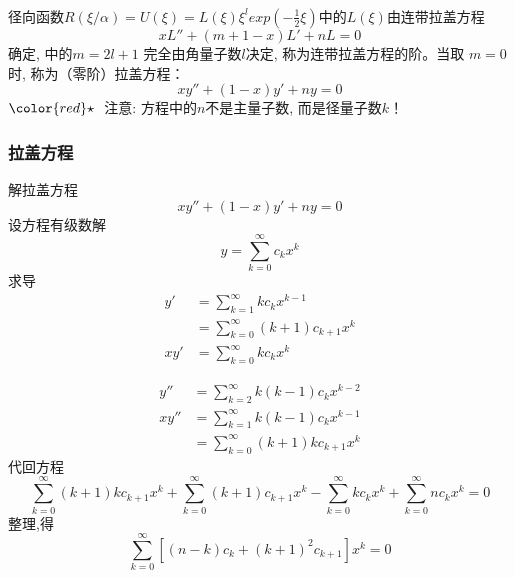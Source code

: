 \begin{frame}[label=current]
\frametitle{}
径向函数$R(\xi /\alpha)=U(\xi) = L(\xi)  \xi ^ l  exp(-\frac{1}{2}\xi )$中的$L(\xi)$由连带拉盖方程
\begin{equation*}
  x L''  + (m+1 -x) L' +n L =0
\end{equation*}
确定, 中的$m= 2l+1$ 完全由角量子数$l$决定, 称为连带拉盖方程的阶。当取 $m=0$时, 称为（零阶）拉盖方程：
\begin{equation*}
  x y''  + (1 -x) y' +n y =0
\end{equation*}
${\color{red}\star}~$ 注意: 方程中的$n$不是主量子数, 而是径量子数$k$！
\end{frame} 

\begin{frame}
\frametitle{拉盖方程}
解拉盖方程
\begin{equation*}
  x y''  + (1 -x) y' +n y =0
\end{equation*}	
\解 设方程有级数解
\begin{equation*}
  y=\sum_{k=0}^{\infty} c_k x^k
\end{equation*}
求导
$$
  \begin{aligned}
    y' &= \sum\limits_{k=1}^{\infty} k c_k x^{k-1} \\ 
      & =\sum\limits_{k=0}^{\infty} (k+1) c_{k+1} x^{k}\\
    xy' &= \sum\limits_{k=0}^{\infty} k c_k x^{k} 
  \end{aligned}
$$
\end{frame}	

\begin{frame}
$$
  \begin{aligned}
    y'' &= \sum\limits_{k=2}^{\infty} k (k-1) c_k x^{k-2} \\
    xy''&=  \sum\limits_{k=1}^{\infty} k (k-1) c_k x^{k-1} \\
        &=\sum\limits_{k=0}^{\infty} (k+1) k c_{k+1} x^{k}
  \end{aligned}
$$
  代回方程 
\[\sum\limits_{k=0}^{\infty} (k+1) k c_{k+1} x^{k} + \sum\limits_{k=0}^{\infty} (k+1) c_{k+1} x^{k} - \sum\limits_{k=0}^{\infty} k c_k x^{k} + \sum_{k=0}^{\infty} n c_k x^k =0\]
整理,得
\begin{equation*}
  \sum_{k=0}^{\infty} [(n-k)c_k +(k+1)^2 c_{k+1}  ] x^k =0
\end{equation*}	
\end{frame}	

